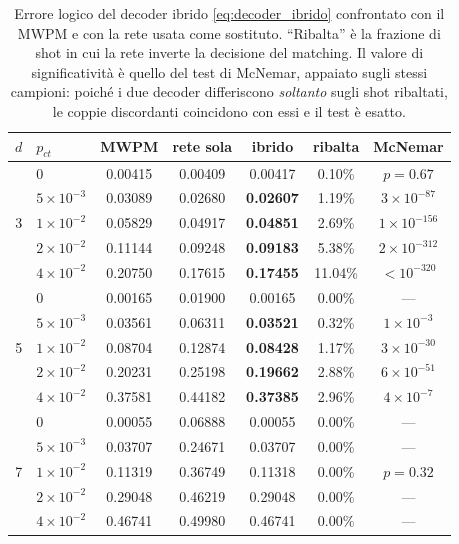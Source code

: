 \begin{table}[H]
\centering
\small
\begin{tabular}{clccccc}
\toprule
$d$ & $p_{ct}$ & \textbf{MWPM} & \textbf{rete sola} & \textbf{ibrido} & \textbf{ribalta} & \textbf{McNemar} \\
\midrule
\multirow{5}{*}{3} & $0$              & 0.00415 & 0.00409 & 0.00417 & 0.10\%  & $p = 0.67$ \\
                   & $5\times10^{-3}$ & 0.03089 & 0.02680 & \textbf{0.02607} & 1.19\%  & $3\times10^{-87}$ \\
                   & $1\times10^{-2}$ & 0.05829 & 0.04917 & \textbf{0.04851} & 2.69\%  & $1\times10^{-156}$ \\
                   & $2\times10^{-2}$ & 0.11144 & 0.09248 & \textbf{0.09183} & 5.38\%  & $2\times10^{-312}$ \\
                   & $4\times10^{-2}$ & 0.20750 & 0.17615 & \textbf{0.17455} & 11.04\% & ${<}10^{-320}$ \\
\midrule
\multirow{5}{*}{5} & $0$              & 0.00165 & 0.01900 & 0.00165 & 0.00\%  & --- \\
                   & $5\times10^{-3}$ & 0.03561 & 0.06311 & \textbf{0.03521} & 0.32\%  & $1\times10^{-3}$ \\
                   & $1\times10^{-2}$ & 0.08704 & 0.12874 & \textbf{0.08428} & 1.17\%  & $3\times10^{-30}$ \\
                   & $2\times10^{-2}$ & 0.20231 & 0.25198 & \textbf{0.19662} & 2.88\%  & $6\times10^{-51}$ \\
                   & $4\times10^{-2}$ & 0.37581 & 0.44182 & \textbf{0.37385} & 2.96\%  & $4\times10^{-7}$ \\
\midrule
\multirow{5}{*}{7} & $0$              & 0.00055 & 0.06888 & 0.00055 & 0.00\%  & --- \\
                   & $5\times10^{-3}$ & 0.03707 & 0.24671 & 0.03707 & 0.00\%  & --- \\
                   & $1\times10^{-2}$ & 0.11319 & 0.36749 & 0.11318 & 0.00\%  & $p = 0.32$ \\
                   & $2\times10^{-2}$ & 0.29048 & 0.46219 & 0.29048 & 0.00\%  & --- \\
                   & $4\times10^{-2}$ & 0.46741 & 0.49980 & 0.46741 & 0.00\%  & --- \\
\bottomrule
\end{tabular}
\caption[Prestazioni del decoder ibrido]{Errore logico del decoder ibrido \eqref{eq:decoder_ibrido} confrontato con il \ac{MWPM} e con la rete usata come sostituto. ``Ribalta'' è la frazione di shot in cui la rete inverte la decisione del matching. Il valore di significatività è quello del test di McNemar, appaiato sugli stessi campioni: poiché i due decoder differiscono \emph{soltanto} sugli shot ribaltati, le coppie discordanti coincidono con essi e il test è esatto.}
\label{tab:neural_ibrido}
\end{table}


